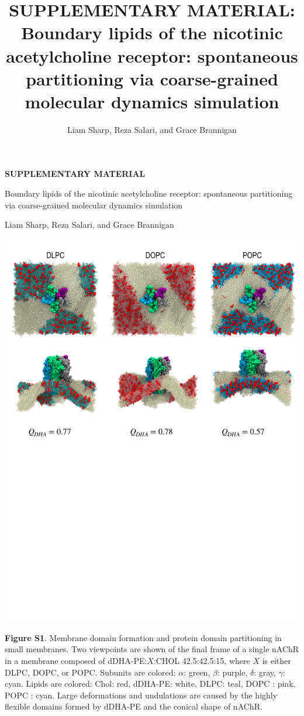 \documentclass[11pt]{report}
\title{SUPPLEMENTARY MATERIAL: Boundary lipids of the nicotinic acetylcholine receptor: spontaneous partitioning via coarse-grained molecular dynamics simulation}
\author{Liam Sharp, Reza Salari, and Grace Brannigan}
\begin{document}
\begin{center}
\Large 	
{ \bf SUPPLEMENTARY MATERIAL} 

Boundary lipids of the nicotinic acetylcholine receptor: spontaneous partitioning via coarse-grained molecular dynamics simulation

{Liam Sharp, Reza Salari, and Grace Brannigan}

\end{center}
\normalsize
		\includegraphics[width=1\linewidth]{SI_Chains.pdf}
	
		{\bf Figure S1}. {Membrane domain formation and protein domain partitioning in small membranes.} Two viewpoints are shown of the final frame of a single nAChR in a membrane composed of dDHA-PE:$X$:CHOL 42.5:42.5:15, where $X$ is either DLPC, DOPC, or POPC. Subunits are colored: $\alpha$: green, $\beta$: purple, $\delta$: gray, $\gamma$: cyan. Lipids are colored: Chol: red, dDHA-PE: white, DLPC: teal, DOPC : pink, POPC : cyan. Large deformations and undulations are caused by the highly flexible domains formed by dDHA-PE and the conical shape of nAChR.  %
	
\end{document}
